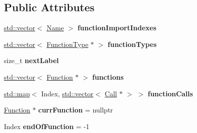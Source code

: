 \subsection*{Public Attributes}
\begin{DoxyCompactItemize}
\item 
\mbox{\label{classwasm_1_1_wasm_binary_builder_a0af9d064fa8c70ac8ea85db4d35515e1}} 
\mbox{\hyperlink{classstd_1_1vector}{std\+::vector}}$<$ \mbox{\hyperlink{structwasm_1_1_name}{Name}} $>$ {\bfseries function\+Import\+Indexes}
\item 
\mbox{\label{classwasm_1_1_wasm_binary_builder_a7796c219d34dfeb3cb4eaf7aa503fd9c}} 
\mbox{\hyperlink{classstd_1_1vector}{std\+::vector}}$<$ \mbox{\hyperlink{classwasm_1_1_function_type}{Function\+Type}} $\ast$ $>$ {\bfseries function\+Types}
\item 
\mbox{\label{classwasm_1_1_wasm_binary_builder_a256a8b676865c3cc302410333df4c621}} 
size\+\_\+t {\bfseries next\+Label}
\item 
\mbox{\label{classwasm_1_1_wasm_binary_builder_adf532034d288f2ab8bf0541753ba5d10}} 
\mbox{\hyperlink{classstd_1_1vector}{std\+::vector}}$<$ \mbox{\hyperlink{classwasm_1_1_function}{Function}} $\ast$ $>$ {\bfseries functions}
\item 
\mbox{\label{classwasm_1_1_wasm_binary_builder_ab99e04ce0439e72f376af3ee5016fc43}} 
\mbox{\hyperlink{classstd_1_1map}{std\+::map}}$<$ Index, \mbox{\hyperlink{classstd_1_1vector}{std\+::vector}}$<$ \mbox{\hyperlink{classwasm_1_1_call}{Call}} $\ast$ $>$ $>$ {\bfseries function\+Calls}
\item 
\mbox{\label{classwasm_1_1_wasm_binary_builder_af187a1ad6148231080e9f5da869c4702}} 
\mbox{\hyperlink{classwasm_1_1_function}{Function}} $\ast$ {\bfseries curr\+Function} = nullptr
\item 
\mbox{\label{classwasm_1_1_wasm_binary_builder_a3ccda180eaa9ce4c2c48d2895f44ea9a}} 
Index {\bfseries end\+Of\+Function} = -\/1
\item 

\end{DoxyCompactItemize}
